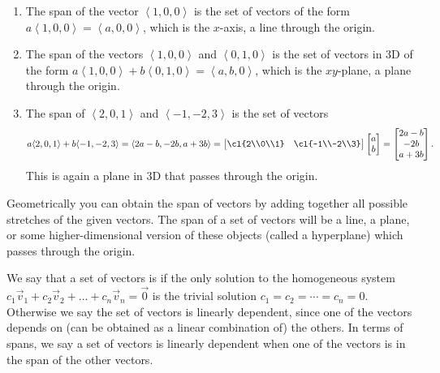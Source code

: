 \begin{example}\label{ex span}
\begin{enumerate}
	\item The span of the vector $\left<1,0,0\right>$ is the set of vectors of the form $a\left<1,0,0\right> = \left<a,0,0\right>$, which is the $x$-axis, a line through the origin. 
	\item The span of the vectors $\left<1,0,0\right>$ and $\left<0,1,0\right>$ is the set of vectors in 3D of the form $a\left<1,0,0\right>+b\left<0,1,0\right>=\left<a,b,0\right>$, which is the $xy$-plane, a plane through the origin. 
	\item The span of $\left<2,0,1\right>$ and $\left<-1,-2,3\right>$ is the set of vectors 
	$$a\langle 2,0,1\rangle+b\langle-1,-2,3\rangle
		= \langle2a-b,-2b,a+3b\rangle
		= \begin{bmatrix} \cl{2\\0\\1}&\cl{-1\\-2\\3}\end{bmatrix}
	\begin{bmatrix}a\\b\end{bmatrix} 
	=\begin{bmatrix}2a-b\\-2b\\a+3b\end{bmatrix}.$$
        This is again a plane in 3D that passes through the origin.
\end{enumerate}
\end{example}
Geometrically you can obtain the span of vectors by adding together all possible stretches of the given vectors. The span of a set of vectors will be a line, a plane, or some higher-dimensional version of these objects (called a hyperplane) which passes through the origin. 

We say that a set of vectors is  if the only solution to the homogeneous system $c_1\vec v_{1}+c_2\vec v_{2}+\ldots+c_n\vec v_{n}=\vec 0$ is the trivial solution $c_1=c_2=\cdots=c_n=0$. 
Otherwise we say the set of vectors is linearly dependent, since one of the vectors depends on (can be obtained as a linear combination of) the others. In terms of spans, we say a set of vectors is linearly dependent when one of the vectors is in the span of the other vectors. 

